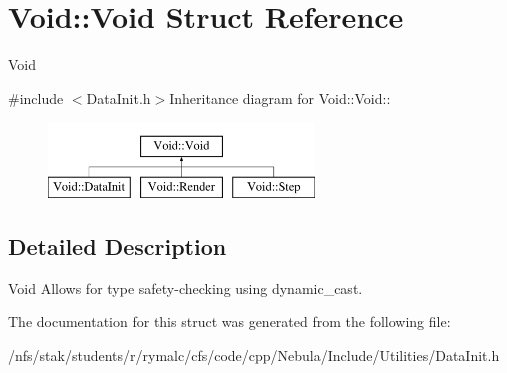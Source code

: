 \hypertarget{structVoid_1_1Void}{
\section{Void::Void Struct Reference}
\label{structVoid_1_1Void}
}


Void  


{\ttfamily \#include $<$DataInit.h$>$}Inheritance diagram for Void::Void::\begin{figure}[H]
\begin{center}
\leavevmode
\includegraphics[height=2cm]{structVoid_1_1Void}
\end{center}
\end{figure}


\subsection{Detailed Description}
Void Allows for type safety-\/checking using dynamic\_\-cast. 

The documentation for this struct was generated from the following file:\begin{DoxyCompactItemize}
\item 
/nfs/stak/students/r/rymalc/cfs/code/cpp/Nebula/Include/Utilities/DataInit.h\end{DoxyCompactItemize}
